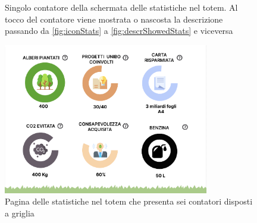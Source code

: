 \begin{figure}[h]
    \centering
    \caption[Pagina delle statistiche nel totem]{Singolo contatore della schermata delle statistiche nel totem. Al tocco del contatore viene mostrata o nascosta la descrizione passando da \ref{fig:iconStats} a \ref{fig:descrShowedStats} e viceversa}
    \label{fig:statCircle}
\end{figure}

\begin{figure}[h]
    \centering
    \includegraphics[width=0.8\textwidth]{img/statsPage.png}
    \caption[Pagina delle statistiche nel totem]{Pagina delle statistiche nel totem che presenta sei contatori disposti a griglia}
    \label{fig:statsPage}
\end{figure}

